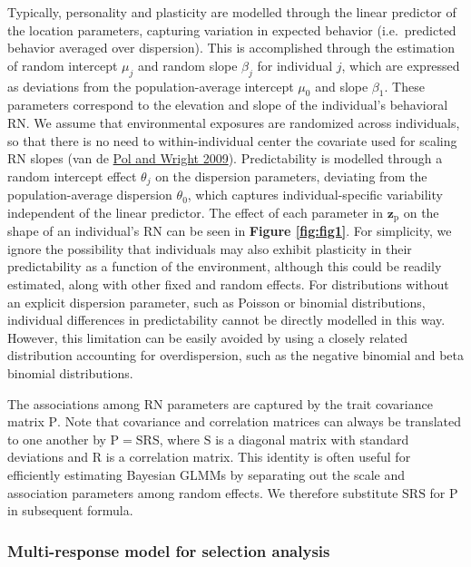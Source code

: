 \documentclass{article}
\begin{document}
Typically, personality and plasticity are modelled through the linear
predictor of the location parameters, capturing variation in expected
behavior (i.e.~predicted behavior averaged over dispersion). This is
accomplished through the estimation of random intercept \(\mu_j\) and
random slope \(\beta_j\) for individual \(j\), which are expressed as
deviations from the population-average intercept \(\mu_0\) and slope
\(\beta_1\). These parameters correspond to the elevation and slope of
the individual's behavioral RN. We assume that environmental exposures
are randomized across individuals, so that there is no need to
within-individual center the covariate used for scaling RN slopes (van
de \protect\hyperlink{ref-Pol2009}{Pol and Wright 2009}). Predictability
is modelled through a random intercept effect \(\theta_j\) on the
dispersion parameters, deviating from the population-average dispersion
\(\theta_0\), which captures individual-specific variability independent
of the linear predictor. The effect of each parameter in
\(\boldsymbol{z_{\mathrm{p}}}\) on the shape of an individual's RN can
be seen in \textbf{Figure \ref{fig:fig1}}. For simplicity, we ignore the
possibility that individuals may also exhibit plasticity in their
predictability as a function of the environment, although this could be
readily estimated, along with other fixed and random effects. For
distributions without an explicit dispersion parameter, such as Poisson
or binomial distributions, individual differences in predictability
cannot be directly modelled in this way. However, this limitation can be
easily avoided by using a closely related distribution accounting for
overdispersion, such as the negative binomial and beta binomial
distributions.

The associations among RN parameters are captured by the trait
covariance matrix \(\boldsymbol{\mathrm{P}}\). Note that covariance and
correlation matrices can always be translated to one another by
\(\boldsymbol{\mathrm{P}}=\boldsymbol{\mathrm{S}}\boldsymbol{\mathrm{R}}\boldsymbol{\mathrm{S}}\),
where \(\boldsymbol{\mathrm{S}}\) is a diagonal matrix with standard
deviations and \(\boldsymbol{\mathrm{R}}\) is a correlation matrix. This
identity is often useful for efficiently estimating Bayesian GLMMs by
separating out the scale and association parameters among random
effects. We therefore substitute
\(\boldsymbol{\mathrm{S}}\boldsymbol{\mathrm{R}}\boldsymbol{\mathrm{S}}\)
for \(\boldsymbol{\mathrm{P}}\) in subsequent formula.

\hypertarget{multi-response-model-for-selection-analysis}{%
\subsubsection{Multi-response model for selection
analysis}\label{multi-response-model-for-selection-analysis}}
\end{document}
